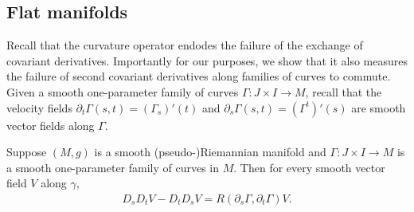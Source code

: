 \subsection{Flat manifolds}
Recall that the curvature operator endodes the failure of the exchange of covariant derivatives. Importantly for our purposes, we show that it also measures the failure of second covariant derivatives along families of curves to commute. Given a smooth one-parameter family of curves $\Gamma:J\times I\to M$, recall that the velocity fields $\partial_t\Gamma(s,t)=(\Gamma_s)'(t)$ and $\partial_s\Gamma(s,t)=(\Gamma^t)'(s)$ are smooth vector fields along $\Gamma$.
\begin{proposition}\label{Riemann curvature second derivatire curve}
Suppose $(M,g)$ is a smooth (pseudo-)Riemannian manifold and $\Gamma:J\times I\to M$ is a smooth one-parameter family of curves in $M$. Then for every smooth vector field $V$ along $\gamma$,
\begin{align}\label{Riemann curvature second derivatire curve-1}
D_sD_tV-D_tD_sV=R(\partial_s\Gamma,\partial_t\Gamma)V.
\end{align}
\end{proposition}
